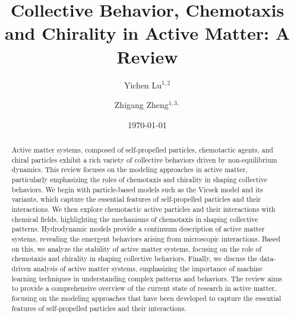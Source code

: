\documentclass[a4paper, amsfonts, amssymb, amsmath, reprint, showkeys, showpacs, nofootinbib, twoside]{revtex4-2}
\begin{document}
\title{Collective Behavior, Chemotaxis and Chirality in Active Matter: A Review}

\author{Yichen Lu$^{1,2}$}
\author{Zhigang Zheng$^{1,3,}$}


\date{\today} %

\begin{abstract}
    Active matter systems, composed of self-propelled particles, chemotactic agents, and chiral particles exhibit a rich variety of collective behaviors driven by non-equilibrium dynamics. This review focuses on the modeling approaches in active matter, particularly emphasizing the roles of chemotaxis and chirality in shaping collective behaviors. We begin with particle-based models such as the Vicsek model and its variants, which capture the essential features of self-propelled particles and their interactions. We then explore chemotactic active particles and their interactions with chemical fields, highlighting the mechanisms of chemotaxis in shaping collective patterns. Hydrodynamic models provide a continuum description of active matter systems, revealing the emergent behaviors arising from microscopic interactions. Based on this, we analyze the stability of active matter systems, focusing on the role of chemotaxis and chirality in shaping collective behaviors. 
    Finally, we discuss the data-driven analysis of active matter systems, emphasizing the importance of machine learning techniques in understanding complex patterns and behaviors. The review aims to provide a comprehensive overview of the current state of research in active matter, focusing on the modeling approaches that have been developed to capture the essential features of self-propelled particles and their interactions.
\end{abstract}


\maketitle
\end{document}
